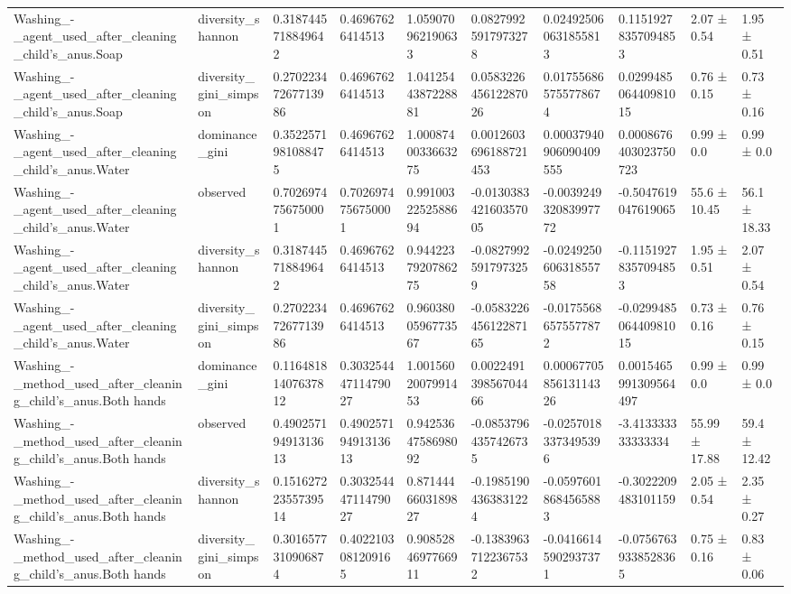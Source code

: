 \begin{longtable}{llllllllll}
Washing\_-\_agent\_used\_after\_cleaning\_child’s\_anus.Soap & diversity\_shannon & 0.3187445718849642 & 0.46967626414513 & 1.059070962190633 & 0.08279925917973278 & 0.024925060631855813 & 0.11519278357094853 & 2.07 ± 0.54 & 1.95 ± 0.51 \\
Washing\_-\_agent\_used\_after\_cleaning\_child’s\_anus.Soap & diversity\_gini\_simpson & 0.27022347267713986 & 0.46967626414513 & 1.0412544387228881 & 0.058322645612287026 & 0.017556865755778674 & 0.029948506440981015 & 0.76 ± 0.15 & 0.73 ± 0.16 \\
Washing\_-\_agent\_used\_after\_cleaning\_child’s\_anus.Water & dominance\_gini & 0.3522571981088475 & 0.46967626414513 & 1.0008740033663275 & 0.0012603696188721453 & 0.00037940906090409555 & 0.0008676403023750723 & 0.99 ± 0.0 & 0.99 ± 0.0 \\
Washing\_-\_agent\_used\_after\_cleaning\_child’s\_anus.Water & observed & 0.7026974756750001 & 0.7026974756750001 & 0.9910032252588694 & -0.013038342160357005 & -0.003924932083997772 & -0.5047619047619065 & 55.6 ± 10.45 & 56.1 ± 18.33 \\
Washing\_-\_agent\_used\_after\_cleaning\_child’s\_anus.Water & diversity\_shannon & 0.3187445718849642 & 0.46967626414513 & 0.9442237920786275 & -0.08279925917973259 & -0.024925060631855758 & -0.11519278357094853 & 1.95 ± 0.51 & 2.07 ± 0.54 \\
Washing\_-\_agent\_used\_after\_cleaning\_child’s\_anus.Water & diversity\_gini\_simpson & 0.27022347267713986 & 0.46967626414513 & 0.9603800596773567 & -0.058322645612287165 & -0.01755686575577872 & -0.029948506440981015 & 0.73 ± 0.16 & 0.76 ± 0.15 \\
Washing\_-\_method\_used\_after\_cleaning\_child’s\_anus.Both hands & dominance\_gini & 0.11648181407637812 & 0.30325444711479027 & 1.0015602007991453 & 0.002249139856704466 & 0.0006770585613114326 & 0.0015465991309564497 & 0.99 ± 0.0 & 0.99 ± 0.0 \\
Washing\_-\_method\_used\_after\_cleaning\_child’s\_anus.Both hands & observed & 0.49025719491313613 & 0.49025719491313613 & 0.9425364758698092 & -0.08537964357426735 & -0.02570183373495396 & -3.413333333333334 & 55.99 ± 17.88 & 59.4 ± 12.42 \\
Washing\_-\_method\_used\_after\_cleaning\_child’s\_anus.Both hands & diversity\_shannon & 0.15162722355739514 & 0.30325444711479027 & 0.8714446603189827 & -0.19851904363831224 & -0.05976018684565883 & -0.3022209483101159 & 2.05 ± 0.54 & 2.35 ± 0.27 \\
Washing\_-\_method\_used\_after\_cleaning\_child’s\_anus.Both hands & diversity\_gini\_simpson & 0.3016577310906874 & 0.4022103081209165 & 0.9085284697766911 & -0.13839637122367532 & -0.04166145902937371 & -0.07567639338528365 & 0.75 ± 0.16 & 0.83 ± 0.06 \\

\end{longtable}
